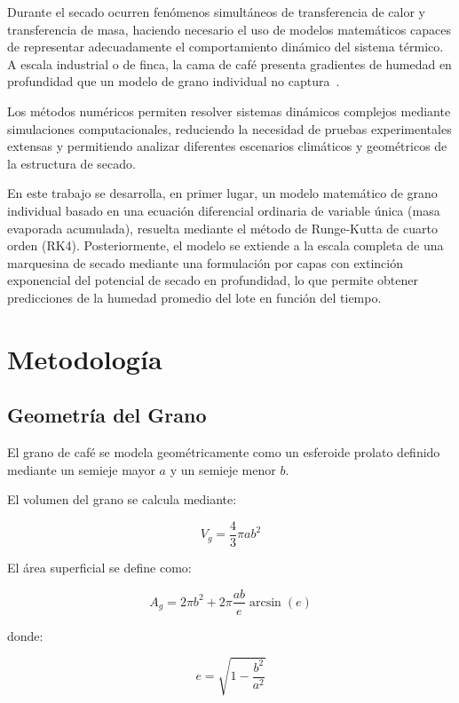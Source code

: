 \documentclass[conference]{IEEEtran}
\begin{document}
Durante el secado ocurren fenómenos simultáneos de transferencia de calor y transferencia de masa, haciendo necesario el uso de modelos matemáticos capaces de representar adecuadamente el comportamiento dinámico del sistema térmico. A escala industrial o de finca, la cama de café presenta gradientes de humedad en profundidad que un modelo de grano individual no captura~\cite{ciro10}.

Los métodos numéricos permiten resolver sistemas dinámicos complejos mediante simulaciones computacionales, reduciendo la necesidad de pruebas experimentales extensas y permitiendo analizar diferentes escenarios climáticos y geométricos de la estructura de secado.

En este trabajo se desarrolla, en primer lugar, un modelo matemático de grano individual basado en una ecuación diferencial ordinaria de variable única (masa evaporada acumulada), resuelta mediante el método de Runge-Kutta de cuarto orden (RK4). Posteriormente, el modelo se extiende a la escala completa de una marquesina de secado mediante una formulación por capas con extinción exponencial del potencial de secado en profundidad, lo que permite obtener predicciones de la humedad promedio del lote en función del tiempo.

\section{Metodología}

\subsection{Geometría del Grano}

El grano de café se modela geométricamente como un esferoide prolato definido mediante un semieje mayor $a$ y un semieje menor $b$.

El volumen del grano se calcula mediante:

\begin{equation}
V_g=
\frac{4}{3}\pi ab^2
\end{equation}

El área superficial se define como:

\begin{equation}
A_g=
2\pi b^2+
2\pi \frac{ab}{e}\arcsin(e)
\end{equation}

donde:

\begin{equation}
e=
\sqrt{1-\frac{b^2}{a^2}}
\end{equation}
\end{document}
